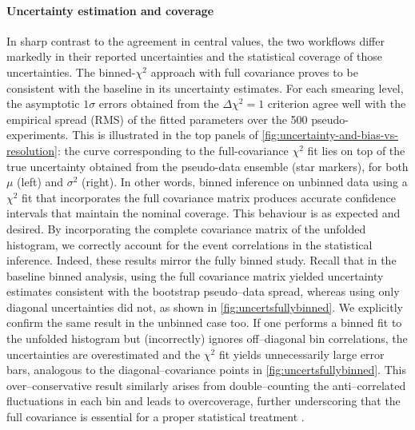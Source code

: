         \paragraph{Uncertainty estimation and coverage}
            In sharp contrast to the agreement in central values, the two workflows differ markedly in their reported uncertainties and the statistical coverage of those uncertainties.
            The binned-$\chi^2$ approach with full covariance proves to be consistent with the baseline in its uncertainty estimates.
            For each smearing level, the asymptotic $1\sigma$ errors obtained from the $\Delta\chi^2=1$ criterion agree well with the empirical spread (RMS) of the fitted parameters over the 500 pseudo-experiments.
            This is illustrated in the top panels of \cref{fig:uncertainty-and-bias-vs-resolution}: the curve corresponding to the full-covariance $\chi^2$ fit lies on top of the true uncertainty obtained from the pseudo-data ensemble (star markers), for both $\mu$ (left) and $\sigma^2$ (right). In other words, binned inference on unbinned data using a \(\chi^2\) fit that incorporates the full covariance matrix produces accurate confidence intervals that maintain the nominal coverage.
            This behaviour is as expected and desired.
            By incorporating the complete covariance matrix of the unfolded histogram, we correctly account for the event correlations in the statistical inference.
            Indeed, these results mirror the fully binned study.
            Recall that in the baseline binned analysis, using the full covariance matrix yielded uncertainty estimates consistent with the bootstrap pseudo--data spread, whereas using only diagonal uncertainties did not, as shown in \cref{fig:uncertsfullybinned}.
            We explicitly confirm the same result in the unbinned case too.
            If one performs a binned fit to the unfolded histogram but (incorrectly) ignores off--diagonal bin correlations, the uncertainties are overestimated and the $\chi^2$ fit yields unnecessarily large error bars, analogous to the diagonal--covariance points in \cref{fig:uncertsfullybinned}.
            This over--conservative result similarly arises from double--counting the anti--correlated fluctuations in each bin and leads to overcoverage, further underscoring that the full covariance is essential for a proper statistical treatment .
    
